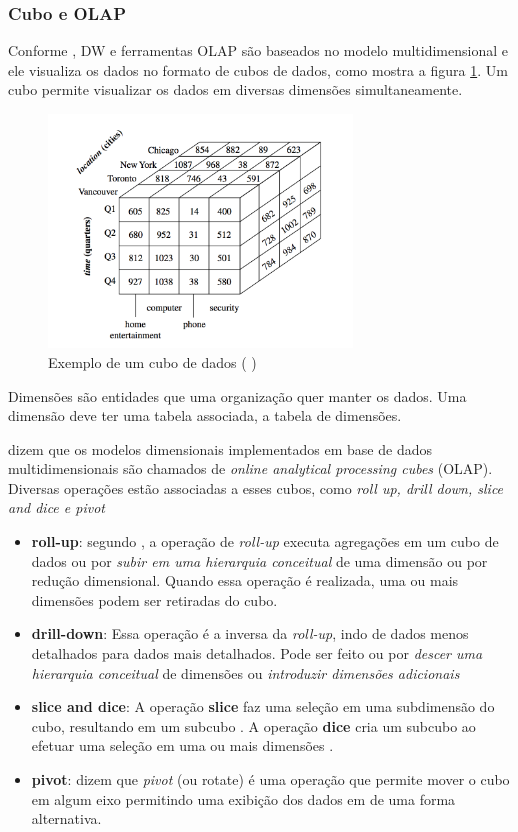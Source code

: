 \subsubsection{Cubo e OLAP}
Conforme , DW e ferramentas OLAP são baseados no modelo multidimensional e ele visualiza os dados no formato de cubos de dados, como mostra a figura \ref{cube}. Um cubo permite visualizar os dados em diversas dimensões simultaneamente.
\begin{figure}[ht]
\centering
\includegraphics[height=6.2cm]{imagens/datacube.png}
\caption{Exemplo de um cubo de dados (\citeauthor{jmj} \citeyear{jmj})}
\label{cube}
\end{figure}
Dimensões são entidades que uma organização quer manter os dados. Uma dimensão deve ter uma tabela associada, a tabela de dimensões.


 dizem que os modelos dimensionais implementados em base de dados multidimensionais são chamados de \textit{online analytical processing cubes} (OLAP). Diversas operações estão associadas a esses cubos, como \textit{roll up, drill down, slice and dice e pivot}

\begin{itemize}
    \item \textbf{roll-up}: segundo , a operação de \textit{roll-up} executa agregações em um cubo de dados ou por \textit{subir em uma hierarquia conceitual} de uma dimensão ou por redução dimensional. Quando essa operação é realizada, uma ou mais dimensões podem ser retiradas do cubo.
    
    \item \textbf{drill-down}: Essa operação é a inversa da \textit{roll-up}, indo de dados menos detalhados para dados mais detalhados. Pode ser feito ou por \textit{descer uma hierarquia conceitual} de dimensões ou \textit{introduzir dimensões adicionais} \citep{jmj}
    
    \item \textbf{slice and dice}: A operação \textbf{slice} faz uma seleção em uma subdimensão do cubo, resultando em um subcubo \citep{jmj}. A operação \textbf{dice} cria um subcubo ao efetuar uma seleção em uma ou mais dimensões \citep{jmj}.
    
    \item \textbf{pivot}:  dizem que \textit{pivot} (ou rotate) é uma operação que permite mover o cubo em algum eixo permitindo uma exibição dos dados em de uma forma alternativa.
\end{itemize}
